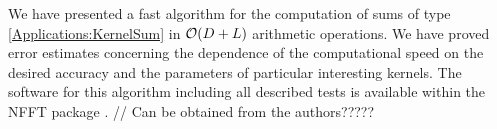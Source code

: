 \documentclass[11pt,a4paper,twoside,bibtotoc]{scrartcl}
\theoremstyle{plain}
\theoremstyle{definition}
\theoremstyle{remark}
\numberwithin{equation}{section}
\numberwithin{table}{section}
\numberwithin{figure}{section}
\begin{document}
We have presented a fast algorithm for the computation of sums of type
\eqref{Applications:KernelSum} in ${\cal O} (D +L)$ arithmetic operations.
We have proved error estimates concerning the dependence of the computational
speed on the desired accuracy and the parameters of particular interesting
kernels.
The software for this algorithm including all described tests is available
within the NFFT package \cite[{\tt ./example/fastsumS2}]{kupo02C}. // Can be
obtained from the authors?????



\end{document}
